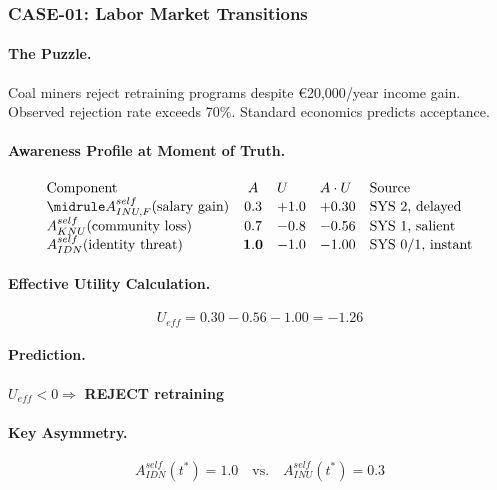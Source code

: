 \subsubsection{CASE-01: Labor Market Transitions}

\paragraph{The Puzzle.}
Coal miners reject retraining programs despite \euro{20,000}/year income gain. Observed rejection rate exceeds 70\%. Standard economics predicts acceptance.

\paragraph{Awareness Profile at Moment of Truth.}

\begin{equation}
\begin{array}{lclll}
\text{Component} & A & U & A \cdot U & \text{Source} \\
\midrule
A^{self}_{INU,F}(\text{salary gain}) & 0.3 & +1.0 & +0.30 & \text{SYS 2, delayed} \\
A^{self}_{KNU}(\text{community loss}) & 0.7 & -0.8 & -0.56 & \text{SYS 1, salient} \\
A^{self}_{IDN}(\text{identity threat}) & \mathbf{1.0} & -1.0 & -1.00 & \text{SYS 0/1, instant}
\end{array}
\end{equation}

\paragraph{Effective Utility Calculation.}
\begin{equation}
\boxed{U_{eff} = 0.30 - 0.56 - 1.00 = \mathbf{-1.26}}
\end{equation}

\paragraph{Prediction.}
$U_{eff} < 0 \Rightarrow$ \textbf{REJECT retraining}

\paragraph{Key Asymmetry.}
\begin{equation}
A^{self}_{IDN}(t^*) = 1.0 \quad \text{vs.} \quad A^{self}_{INU}(t^*) = 0.3
\end{equation}

